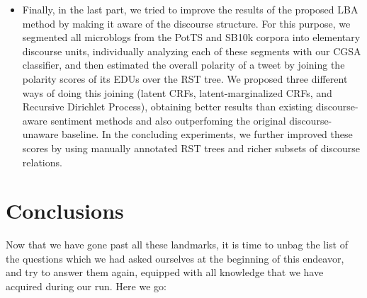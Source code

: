 \begin{itemize}
\item Finally, in the last part, we tried to improve the results of
  the proposed LBA method by making it aware of the discourse
  structure.  For this purpose, we segmented all microblogs from the
  PotTS and SB10k corpora into elementary discourse units,
  individually analyzing each of these segments with our CGSA
  classifier, and then estimated the overall polarity of a tweet by
  joining the polarity scores of its EDUs over the RST tree.  We
  proposed three different ways of doing this joining (latent CRFs,
  latent-marginalized CRFs, and Recursive Dirichlet Process),
  obtaining better results than existing discourse-aware sentiment
  methods and also outperfoming the original discourse-unaware
  baseline.  In the concluding experiments, we further improved these
  scores by using manually annotated RST trees and richer subsets of
  discourse relations.
\end{itemize}


\section*{Conclusions}

Now that we have gone past all these landmarks, it is time to unbag
the list of the questions which we had asked ourselves at the
beginning of this endeavor, and try to answer them again, equipped
with all knowledge that we have acquired during our run.  Here we go:

